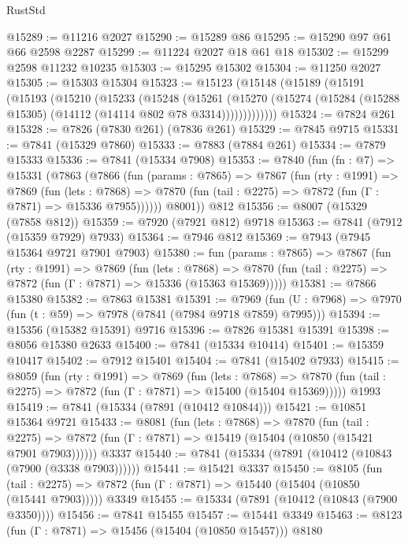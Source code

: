 \begin{lexlean}{RustStd}
\begin{coremodule}
@15289 := @11216 @2027
@15290 := @15289 @86
@15295 := @15290 @97 @61 @66 @2598 @2287
@15299 := @11224 @2027 @18 @61 @18
@15302 := @15299 @2598 @11232 @10235
@15303 := @15295 @15302
@15304 := @11250 @2027
@15305 := @15303 @15304
@15323 := @15123
    (@15148
      (@15189
        (@15191
          (@15193
            (@15210
              (@15233
                (@15248
                  (@15261
                    (@15270
                      (@15274 (@15284 (@15288 @15305) (@14112 (@14114 @802 @78 @3314)))))))))))))
@15324 := @7824 @261
@15328 := @7826 (@7830 @261) (@7836 @261)
@15329 := @7845 @9715
@15331 := @7841 (@15329 @7860)
@15333 := @7883 (@7884 @261)
@15334 := @7879 @15333
@15336 := @7841 (@15334 @7908)
@15353 := @7840
    (fun (fn : @7) =>
    @15331
      (@7863
        (@7866
          (fun (params : @7865) =>
          @7867
            (fun (rty : @1991) =>
            @7869
              (fun (lets : @7868) =>
              @7870 (fun (tail : @2275) => @7872 (fun (Γ : @7871) => @15336 @7955))))))
        @8001))
    @812
@15356 := @8007 (@15329 (@7858 @812))
@15359 := @7920 (@7921 @812) @9718
@15363 := @7841 (@7912 (@15359 @7929) @7933)
@15364 := @7946 @812
@15369 := @7943 (@7945 @15364 @9721 @7901 @7903)
@15380 := fun (params : @7865) =>
  @7867
    (fun (rty : @1991) =>
    @7869
      (fun (lets : @7868) =>
      @7870 (fun (tail : @2275) => @7872 (fun (Γ : @7871) => @15336 (@15363 @15369)))))
@15381 := @7866 @15380
@15382 := @7863 @15381
@15391 := @7969
    (fun (U : @7968) => @7970 (fun (t : @59) => @7978 (@7841 (@7984 @9718 @7859) @7995)))
@15394 := @15356 (@15382 @15391) @9716
@15396 := @7826 @15381 @15391
@15398 := @8056 @15380 @2633
@15400 := @7841 (@15334 @10414)
@15401 := @15359 @10417
@15402 := @7912 @15401
@15404 := @7841 (@15402 @7933)
@15415 := @8059
    (fun (rty : @1991) =>
    @7869
      (fun (lets : @7868) =>
      @7870 (fun (tail : @2275) => @7872 (fun (Γ : @7871) => @15400 (@15404 @15369)))))
    @1993
@15419 := @7841 (@15334 (@7891 (@10412 @10844)))
@15421 := @10851 @15364 @9721
@15433 := @8081
    (fun (lets : @7868) =>
    @7870
      (fun (tail : @2275) =>
      @7872 (fun (Γ : @7871) => @15419 (@15404 (@10850 (@15421 @7901 @7903))))))
    @3337
@15440 := @7841 (@15334 (@7891 (@10412 (@10843 (@7900 (@3338 @7903))))))
@15441 := @15421 @3337
@15450 := @8105
    (fun (tail : @2275) => @7872 (fun (Γ : @7871) => @15440 (@15404 (@10850 (@15441 @7903)))))
    @3349
@15455 := @15334 (@7891 (@10412 (@10843 (@7900 @3350))))
@15456 := @7841 @15455
@15457 := @15441 @3349
@15463 := @8123 (fun (Γ : @7871) => @15456 (@15404 (@10850 @15457))) @8180

\end{coremodule}
\end{lexlean}
